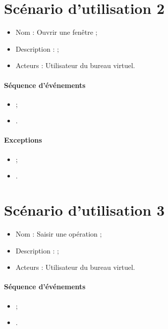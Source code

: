
\section{Scénario d'utilisation 2}
\begin{itemize}
	\item Nom : Ouvrir une fenêtre ;
	\item Description :  ;
	\item Acteurs : Utilisateur du bureau virtuel.
\end{itemize}

\paragraph{Séquence d'événements}
\begin{itemize}
	\item ;
	\item .
\end{itemize}

\paragraph{Exceptions}
\begin{itemize}
	\item ;
	\item .
\end{itemize}


\section{Scénario d'utilisation 3}
\begin{itemize}
	\item Nom : Saisir une opération ;
	\item Description :  ;
	\item Acteurs : Utilisateur du bureau virtuel.
\end{itemize}

\paragraph{Séquence d'événements}
\begin{itemize}
	\item ;
	\item .
\end{itemize}

